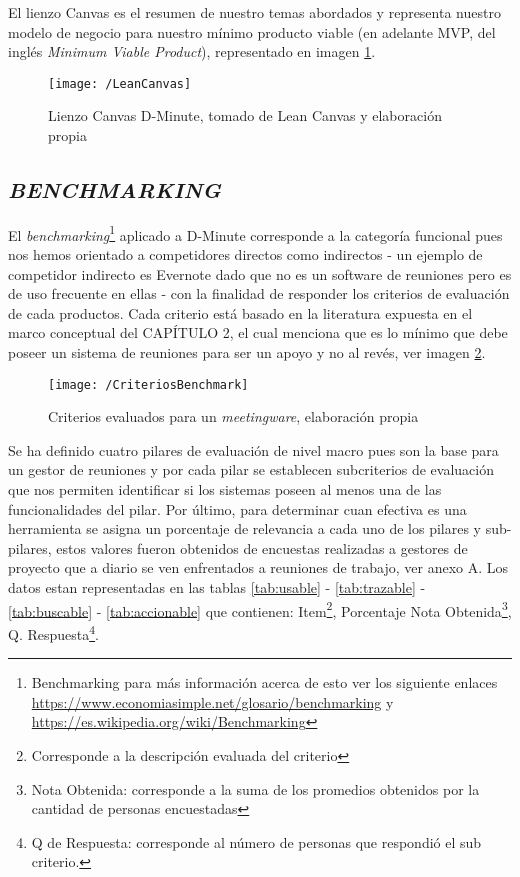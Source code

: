 El lienzo Canvas es el resumen de nuestro temas abordados y representa nuestro modelo de negocio para nuestro mínimo producto viable (en adelante MVP, del inglés \textit{Minimum Viable Product}), representado en imagen \ref{img3-1}.

\begin{figure}[h]
\centering
\texttt{[image: /LeanCanvas]}
\caption{Lienzo Canvas D-Minute, tomado de Lean Canvas y elaboración propia} 
\label{img3-1}
\end{figure}

\subsection{\textit{BENCHMARKING}}

El \textit{benchmarking}\footnote{Benchmarking para más información acerca de esto ver los siguiente enlaces \url{https://www.economiasimple.net/glosario/benchmarking} y \url{https://es.wikipedia.org/wiki/Benchmarking} } aplicado a D-Minute corresponde a la categoría funcional pues nos hemos orientado a competidores directos como indirectos - un ejemplo de competidor indirecto es Evernote dado que no es un software de reuniones pero es de uso frecuente en ellas - con la finalidad de responder los criterios de evaluación de cada productos. Cada criterio está basado en la literatura expuesta en el marco conceptual del CAPÍTULO 2, el cual menciona que es lo mínimo que debe poseer un sistema de reuniones para ser un apoyo y no al revés, ver imagen \ref{img3-2}.

\begin{figure}[h]
\centering
\texttt{[image: /CriteriosBenchmark]}
\caption{Criterios evaluados para un \textit{meetingware}, elaboración propia} 
\label{img3-2}
\end{figure}

Se ha definido cuatro pilares de evaluación de nivel macro pues son la base para un gestor de reuniones y por cada pilar se establecen subcriterios de evaluación que nos permiten identificar si los sistemas poseen al menos una de las funcionalidades del pilar. Por último, para determinar cuan efectiva es una herramienta se asigna un porcentaje de relevancia a cada uno de los pilares y sub-pilares, estos valores fueron obtenidos de encuestas realizadas a gestores de proyecto que a diario se ven enfrentados a reuniones de trabajo, ver anexo A.  Los datos estan representadas en las tablas \ref{tab:usable} - \ref{tab:trazable} - \ref{tab:buscable} - \ref{tab:accionable} que contienen: Item\footnote{Corresponde a la descripción evaluada del criterio}, Porcentaje Nota Obtenida\footnote{Nota Obtenida: corresponde a la suma de los promedios obtenidos por la cantidad de personas encuestadas}, Q. Respuesta\footnote{Q de Respuesta: corresponde al número de personas que respondió el sub criterio.}.


